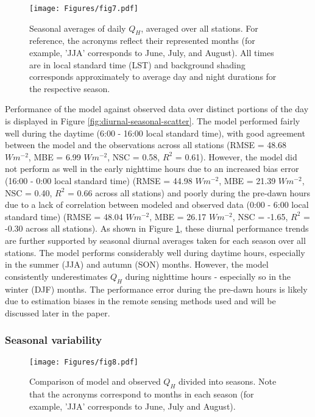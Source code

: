 \begin{figure}[!h]
    \centering
        \texttt{[image: Figures/fig7.pdf]}
    \caption{Seasonal averages of daily $Q_H$, averaged over all stations. For reference, the acronyms reflect their represented months (for example, 'JJA' corresponds to June, July, and August). All times are in local standard time (LST) and background shading corresponds approximately to average day and night durations for the respective season. }
    \label{fig:quee-timeseries}
\end{figure}

Performance of the model against observed data over distinct portions of the day is displayed in Figure \ref{fig:diurnal-seasonal-scatter}. The model performed fairly well during the daytime (6:00 - 16:00 local standard time), with good agreement between the model and the observations across all stations (RMSE = 48.68 $W m^{-2}$, MBE = 6.99 $W m^{-2}$, NSC = 0.58, $R^2$ = 0.61). However, the model did not perform as well in the early nighttime hours due to an increased bias error (16:00 - 0:00 local standard time) (RMSE = 44.98 $W m^{-2}$, MBE = 21.39 $W m^{-2}$, NSC = 0.40, $R^2$ = 0.66 across all stations) and poorly during the pre-dawn hours due to a lack of correlation between modeled and observed data (0:00 - 6:00 local standard time) (RMSE = 48.04 $W m^{-2}$, MBE = 26.17 $W m^{-2}$, NSC = -1.65, $R^2$ = -0.30 across all stations). As shown in Figure \ref{fig:quee-timeseries}, these diurnal performance trends are further supported by seasonal diurnal averages taken for each season over all stations. The model performs considerably well during daytime hours, especially in the summer (JJA) and autumn (SON) months. However, the model consistently underestimates $Q_H$ during nighttime hours - especially so in the winter (DJF) months. The performance error during the pre-dawn hours is likely due to estimation biases in the remote sensing methods used and will be discussed later in the paper.

\FloatBarrier

\subsubsection{Seasonal variability} \label{section:results-seasonal-variability}

\begin{figure}[!h]
    \centering
        \texttt{[image: Figures/fig8.pdf]}
    \caption{Comparison of model and observed $Q_H$ divided into seasons. Note that the acronyms correspond to months in each season (for example, 'JJA' corresponds to June, July and August).}
    \label{fig:seasonal-scatter}
\end{figure}

